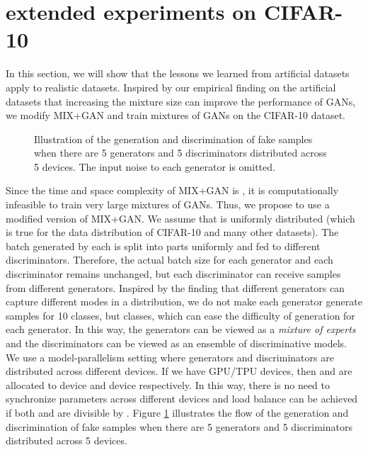 \documentclass[conference]{IEEEtran}
\begin{document}
\section{extended experiments on CIFAR-10}
In this section, we will show that the lessons we learned from artificial datasets apply to realistic datasets. Inspired by our empirical finding on the artificial datasets that increasing the mixture size can improve the performance of GANs, we modify MIX+GAN and train mixtures of GANs on the CIFAR-10\cite{CIFAR10} dataset.
\begin{figure}[!h]
	\begin{center}
	\end{center}
	\caption{Illustration of the generation and discrimination of fake samples when there are 5 generators and 5 discriminators distributed across 5 devices. The input noise to each generator is omitted.}
	\label{distribute}
\end{figure}

Since the time and space complexity of MIX+GAN is , it is computationally infeasible to train very large mixtures of GANs. Thus, we propose to use a modified version of MIX+GAN. We assume that  is uniformly distributed (which is true for the data distribution of CIFAR-10 and many other datasets). The batch generated by each  is split into  parts uniformly and fed to different discriminators. Therefore, the actual batch size for each generator and each discriminator remains unchanged, but each discriminator can receive samples from different generators. Inspired by the finding that different generators can capture different modes in a distribution, we do not make each generator generate samples for 10 classes, but  classes, which can ease the difficulty of generation for each generator. In this way, the generators can be viewed as a \textit{mixture of experts}\cite{ME} and the discriminators can be viewed as an ensemble of discriminative models. We use a model-parallelism setting where generators and discriminators are distributed across different devices. If we have  GPU/TPU devices, then  and  are allocated to device  and device  respectively. In this way, there is no need to synchronize parameters across different devices and load balance can be achieved if both  and  are divisible by . Figure \ref{distribute} illustrates the flow of the generation and discrimination of fake samples when there are 5 generators and 5 discriminators distributed across 5 devices. 
\end{document}
